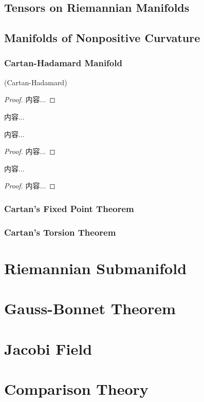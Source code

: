 \documentclass[Total.tex]{subfiles}
\begin{document}
		\section{Tensors on Riemannian Manifolds}
		\section{Manifolds of Nonpositive Curvature}
			\subsection{Cartan-Hadamard Manifold}
			\begin{theorem}
				(Cartan-Hadamard)
			\end{theorem}
			\begin{proof}
				内容...
			\end{proof}
			\begin{Def}
				内容...
			\end{Def}
			\begin{proposition}
				内容...
			\end{proposition}
			\begin{proof}
				内容...
			\end{proof}
			
			\begin{proposition}
				内容...
			\end{proposition}
			\begin{proof}
				内容...
			\end{proof}
			\subsection{Cartan's Fixed Point Theorem}
			\subsection{Cartan's Torsion Theorem}
	\chapter{Riemannian Submanifold}
	\chapter{Gauss-Bonnet Theorem}
	\chapter{Jacobi Field}
	\chapter{Comparison Theory}
\end{document}
